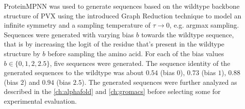 ProteinMPNN was used to generate sequences based on the wildtype backbone structure of PVX using the introduced Graph Reduction technique to model an infinite symmetry and a sampling temperature of $\tau\rightarrow 0$, e.g. argmax sampling. Sequences were generated with varying bias $b$ towards the wildtype sequence, that is by increasing the logit of the residue that's present in the wildtype structure by $b$ before sampling the amino acid. For each of the bias values $b \in \{0, 1, 2, 2.5\}$, five sequences were generated. The sequence identity of the generated sequences to the wildtype was about $0.54$ (bias $0$), $0.73$ (bias $1$), $0.88$ (bias $2$) and $0.94$ (bias $2.5$). The generated sequences were further analyzed as described in the \autoref{ch:alphafold} and \autoref{ch:gromacs} before selecting some for experimental evaluation. 